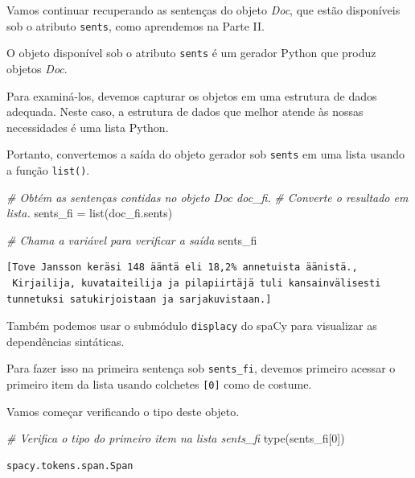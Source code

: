 \documentclass[
  brazilian,
]{article}
\newenvironment{Shaded}{}{}
\newcommand{\BuiltInTok}[1]{#1}
\newcommand{\CommentTok}[1]{\textcolor[rgb]{0.38,0.63,0.69}{\textit{#1}}}
\newcommand{\DecValTok}[1]{\textcolor[rgb]{0.25,0.63,0.44}{#1}}
\newcommand{\NormalTok}[1]{#1}
\newcommand{\OperatorTok}[1]{\textcolor[rgb]{0.40,0.40,0.40}{#1}}
\begin{document}
Vamos continuar recuperando as sentenças do objeto \emph{Doc}, que estão
disponíveis sob o atributo \texttt{sents}, como aprendemos na Parte II.

O objeto disponível sob o atributo \texttt{sents} é um gerador Python
que produz objetos \emph{Doc}.

Para examiná-los, devemos capturar os objetos em uma estrutura de dados
adequada. Neste caso, a estrutura de dados que melhor atende às nossas
necessidades é uma lista Python.

Portanto, convertemos a saída do objeto gerador sob \texttt{sents} em
uma lista usando a função \texttt{list()}.

\begin{Shaded}
\begin{Highlighting}[]
\CommentTok{\# Obtém as sentenças contidas no objeto Doc \textquotesingle{}doc\_fi\textquotesingle{}.}
\CommentTok{\# Converte o resultado em lista.}
\NormalTok{sents\_fi }\OperatorTok{=} \BuiltInTok{list}\NormalTok{(doc\_fi.sents)}

\CommentTok{\# Chama a variável para verificar a saída}
\NormalTok{sents\_fi}
\end{Highlighting}
\end{Shaded}

\begin{verbatim}
[Tove Jansson keräsi 148 ääntä eli 18,2% annetuista äänistä.,
 Kirjailija, kuvataiteilija ja pilapiirtäjä tuli kansainvälisesti tunnetuksi satukirjoistaan ja sarjakuvistaan.]
\end{verbatim}

Também podemos usar o submódulo \texttt{displacy} do spaCy para
visualizar as dependências sintáticas.

Para fazer isso na primeira sentença sob \texttt{sents\_fi}, devemos
primeiro acessar o primeiro item da lista usando colchetes
\texttt{{[}0{]}} como de costume.

Vamos começar verificando o tipo deste objeto.

\begin{Shaded}
\begin{Highlighting}[]
\CommentTok{\# Verifica o tipo do primeiro item na lista \textquotesingle{}sents\_fi\textquotesingle{}}
\BuiltInTok{type}\NormalTok{(sents\_fi[}\DecValTok{0}\NormalTok{])}
\end{Highlighting}
\end{Shaded}

\begin{verbatim}
spacy.tokens.span.Span
\end{verbatim}
\end{document}
